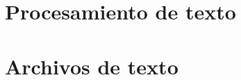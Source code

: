 \chapter{Procesamiento de texto}





\chapter{Archivos de texto}


%
%
%

%
%


%
%
%
%
%
%
%
%
%
%
%
%
%
%
%
%
%
%
%
%

